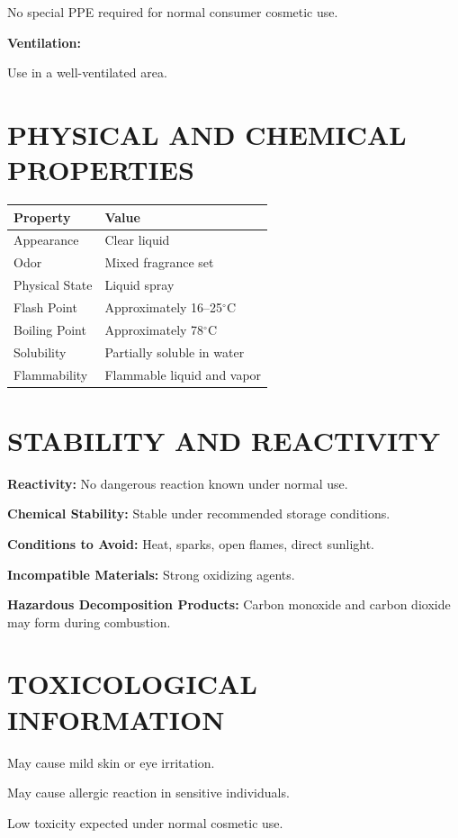 \documentclass[11pt]{article}
\begin{document}
No special PPE required for normal consumer cosmetic use.

\textbf{Ventilation:}

Use in a well-ventilated area.

\section{PHYSICAL AND CHEMICAL PROPERTIES}

\begin{longtable}{|p{2.5in}|p{3in}|}
\hline
\textbf{Property} & \textbf{Value} \\
\hline
Appearance & Clear liquid \\
\hline
Odor & Mixed fragrance set \\
\hline
Physical State & Liquid spray \\
\hline
Flash Point & Approximately 16--25$^\circ$C \\
\hline
Boiling Point & Approximately 78$^\circ$C \\
\hline
Solubility & Partially soluble in water \\
\hline
Flammability & Flammable liquid and vapor \\
\hline
\end{longtable}

\section{STABILITY AND REACTIVITY}

\textbf{Reactivity:} No dangerous reaction known under normal use.

\textbf{Chemical Stability:} Stable under recommended storage conditions.

\textbf{Conditions to Avoid:} Heat, sparks, open flames, direct sunlight.

\textbf{Incompatible Materials:} Strong oxidizing agents.

\textbf{Hazardous Decomposition Products:} Carbon monoxide and carbon dioxide may form during combustion.

\section{TOXICOLOGICAL INFORMATION}

May cause mild skin or eye irritation.

May cause allergic reaction in sensitive individuals.

Low toxicity expected under normal cosmetic use.
\end{document}
